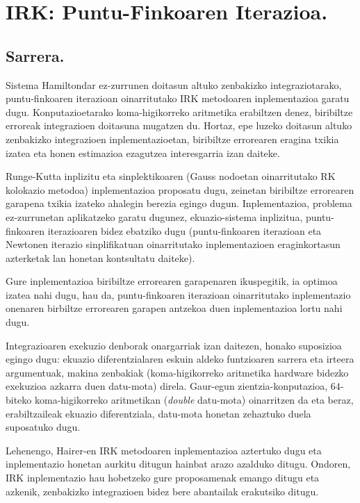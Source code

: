\chapter{IRK: Puntu-Finkoaren Iterazioa.}
\label{chap:IRK-PF}

\section{Sarrera.}


Sistema Hamiltondar ez-zurrunen doitasun altuko zenbakizko integraziotarako, puntu-finkoaren iterazioan oinarritutako IRK metodoaren inplementazioa garatu dugu. Konputazioetarako koma-higikorreko aritmetika erabiltzen denez, biribiltze erroreak integrazioen doitasuna mugatzen du. Hortaz, epe luzeko doitasun altuko zenbakizko integrazioen inplementazioetan, biribiltze errorearen eragina txikia izatea eta honen estimazioa ezagutzea interesgarria izan daiteke. 

Runge-Kutta inplizitu eta sinplektikoaren (Gauss nodoetan oinarritutako RK kolokazio metodoa) inplementazioa proposatu dugu, zeinetan biribiltze errorearen garapena txikia izateko ahalegin berezia egingo dugun. Inplementazioa, problema ez-zurrunetan aplikatzeko garatu dugunez, ekuazio-sistema inplizitua, puntu-finkoaren iterazioaren bidez ebatziko dugu (puntu-finkoaren iterazioan eta Newtonen iterazio sinplifikatuan oinarritutako inplementazioen eraginkortasun azterketak lan honetan \cite{Hairer2006} kontsultatu daiteke).

Gure inplementazioa biribiltze errorearen garapenaren ikuspegitik, ia optimoa izatea nahi dugu, hau da, puntu-finkoaren iterazioan oinarritutako inplementazio onenaren birbiltze errorearen garapen antzekoa duen inplementazioa lortu nahi dugu. 

Integrazioaren exekuzio denborak onargarriak izan daitezen, honako suposizioa egingo dugu: ekuazio diferentzialaren eskuin aldeko funtzioaren sarrera eta irteera argumentuak, makina zenbakiak (koma-higikorreko aritmetika hardware bidezko exekuzioa azkarra duen datu-mota) direla. Gaur-egun zientzia-konputazioa,  $64$-biteko koma-higikorreko aritmetikan (\emph{double} datu-mota) oinarritzen da eta beraz, erabiltzaileak ekuazio diferentziala, datu-mota honetan zehaztuko duela suposatuko dugu. 
 
Lehenengo, Hairer-en IRK metodoaren inplementazioa  \cite{Hairer2008} aztertuko dugu eta inplementazio honetan aurkitu ditugun hainbat arazo azalduko ditugu. Ondoren, IRK inplementazio hau hobetzeko gure proposamenak emango ditugu eta azkenik, zenbakizko integrazioen bidez bere abantailak erakutsiko ditugu.

